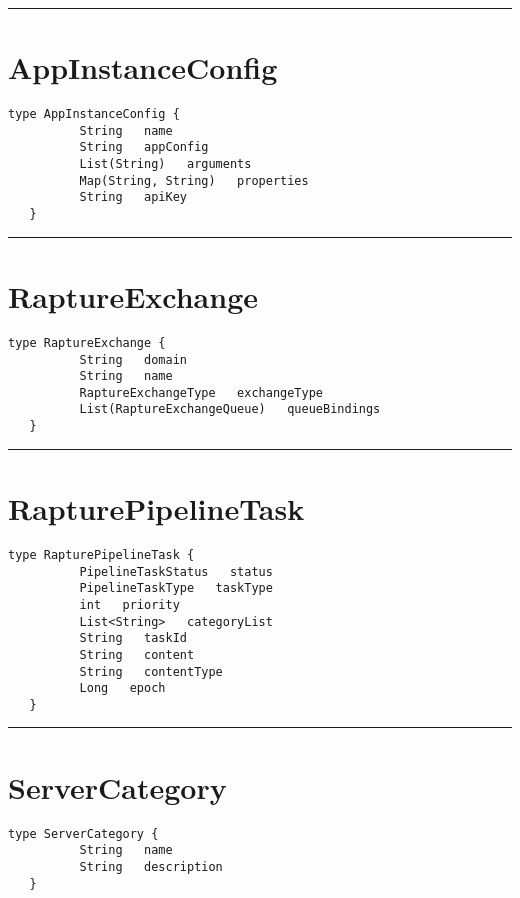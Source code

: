 \rule{12cm}{2pt}
\section{AppInstanceConfig}
\label{type:AppInstanceConfig}

\begin{lstlisting}[style=nonumbers]
   type AppInstanceConfig {
          String   name
          String   appConfig
          List(String)   arguments
          Map(String, String)   properties
          String   apiKey
   }
\end{lstlisting}

\rule{12cm}{2pt}
\section{RaptureExchange}
\label{type:RaptureExchange}

\begin{lstlisting}[style=nonumbers]
   type RaptureExchange {
          String   domain
          String   name
          RaptureExchangeType   exchangeType
          List(RaptureExchangeQueue)   queueBindings
   }
\end{lstlisting}

\rule{12cm}{2pt}
\section{RapturePipelineTask}
\label{type:RapturePipelineTask}

\begin{lstlisting}[style=nonumbers]
   type RapturePipelineTask {
          PipelineTaskStatus   status
          PipelineTaskType   taskType
          int   priority
          List<String>   categoryList
          String   taskId
          String   content
          String   contentType
          Long   epoch
   }
\end{lstlisting}

\rule{12cm}{2pt}
\section{ServerCategory}
\label{type:ServerCategory}

\begin{lstlisting}[style=nonumbers]
   type ServerCategory {
          String   name
          String   description
   }
\end{lstlisting}

